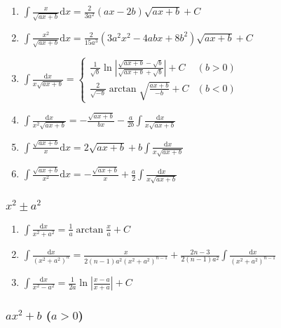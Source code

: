 \begin{tiny}
\begin{enumerate}[noitemsep]
\item $ \int \frac{x}{\sqrt{ax+b}} \mathrm{d}x = \frac{2}{3a^2} (ax-2b) \sqrt{ax+b} + C $

\item $ \int \frac{x^2}{\sqrt{ax+b}} \mathrm{d} x = \frac{2}{15a^3} (3a^2x^2 - 4abx + 8b^2) \sqrt{ax+b} + C $

\item $ \int \frac{\mathrm{d} x}{x\sqrt{ax+b}} = \begin{cases}
\frac{1}{\sqrt{b}}\ln\left| \frac{\sqrt{ax+b} - \sqrt{b}}{\sqrt{ax+b} + \sqrt{b}} \right| + C & (b>0) \\
\frac{2}{\sqrt{-b}}\arctan\sqrt{\frac{ax+b}{-b}} + C & (b<0)
\end{cases} $

\item $ \int \frac{\mathrm{d} x}{x^2\sqrt{ax+b}} = -\frac{\sqrt{ax+b}}{bx} - \frac{a}{2b} \int \frac{\mathrm{d} x}{x\sqrt{ax+b}} $

\item $ \int \frac{\sqrt{ax+b}}{x}\mathrm{d} x = 2\sqrt{ax+b} + b\int\frac{\mathrm{d} x}{x\sqrt{ax+b}} $

\item $ \int \frac{\sqrt{ax+b}}{x^2}\mathrm{d}x = -\frac{\sqrt{ax+b}}{x} + \frac{a}{2} \int \frac{\mathrm{d}x}{x\sqrt{ax+b}} $

\end{enumerate}

\subsubsection{$x^2 \pm a^2$}

\begin{enumerate}[noitemsep]

\item $ \int \frac{\mathrm{d}x}{x^2 + a^2} = \frac{1}{a} \arctan\frac{x}{a} + C$

\item $ \int \frac{\mathrm{d}x}{(x^2+a^2)^n} = \frac{x}{2(n-1)a^2(x^2+a^2)^{n-1}}+\frac{2n-3}{2(n-1)a^2} \int \frac{\mathrm{d}x}{(x^2+a^2)^{n-1}} $

\item $\int \frac{\mathrm{d}x}{x^2-a^2} = \frac{1}{2a}\ln\left| \frac{x-a}{x+a} \right| + C $


\end{enumerate}

\subsubsection{$ax^2+b$ ($a>0$)}


\end{tiny}
